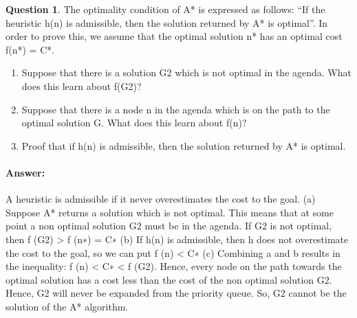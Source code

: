 \documentclass[11pt,a4paper]{article}
\theoremstyle{definition}%
\newtheorem{Q}{Question}[] %
\newcommand{\reponse}[1]{%
\ifthenelse {\boolean{corrige}} {\paragraph{Answer:} \color{darkblue}   #1\color{black}} {}
}
\begin{document}
\begin{Q}
    The optimality condition of A* is expressed as follows: “If the heuristic h(n) is admissible,
then the solution returned by A* is optimal”. In order to prove this, we assume that the
optimal solution n* has an optimal cost f(n*) = C*.

\begin{enumerate}
    \item Suppose that there is a solution G2 which is not optimal in the agenda. What does
    this learn about f(G2)?
    \item Suppose that there is a node n in the agenda which is on the path to the optimal
    solution G. What does this learn about f(n)?
    \item Proof that if h(n) is admissible, then the solution returned by A* is optimal.
\end{enumerate}
\reponse{
    A heuristic is admissible if it never overestimates the cost to the goal.
(a) Suppose A* returns a solution which is not optimal. This means that at some point a
non optimal solution G2 must be in the agenda. If G2 is not optimal, then f (G2) >
f (n∗) = C∗
(b) If h(n) is admissible, then h does not overestimate the cost to the goal, so we can put
f (n) < C∗
(c) Combining a and b results in the inequality: f (n) < C∗ < f (G2). Hence, every node
on the path towards the optimal solution has a cost less than the cost of the non
optimal solution G2. Hence, G2 will never be expanded from the priority queue. So,
G2 cannot be the solution of the A* algorithm.
}
\end{Q}


\end{document}
